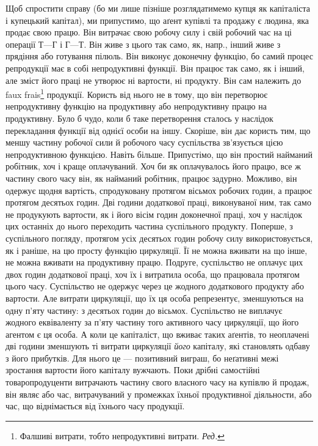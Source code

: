 Щоб спростити справу (бо ми лише пізніше розглядатимемо купця
як капіталіста і купецький капітал), ми припустимо, що аґент купівлі та
продажу є людина, яка продає свою працю. Він витрачає свою робочу
силу і свій робочий час на ці операції $Т — Г$ і $Г — Т$. Він живе з цього
так само, як, напр., інший живе з прядіння або готування пілюль. Він
виконує доконечну функцію, бо самий процес репродукції має в собі
непродуктивні функції. Він працює так само, як і інший, але зміст його
праці не утворює ні вартости, ні продукту. Він сам належить до faux
frais\footnote*{
Фалшиві витрати, тобто непродуктивні витрати. \emph{Ред.}
} продукції. Користь від нього не в тому, що він перетворює
непродуктивну функцію на продуктивну або непродуктивну працю на
продуктивну. Було б чудо, коли б таке перетворення сталось у наслідок
перекладання функції від однієї особи на іншу. Скоріше, він дає користь
тим, що меншу частину робочої сили й робочого часу суспільства
зв’язується цією непродуктивною функцією. Навіть більше. Припустімо,
що він простий найманий робітник, хоч і краще оплачуваний.
Хоч би    як оплачувалось його працю, все ж частину свого часу
він, як    найманий робітник, працює    задурно. Можливо, він
одержує щодня вартість, спродуковану протягом вісьмох робочих годин, а
працює протягом десятьох годин. Дві години додаткової праці, виконуваної
ним, так само не продукують вартости, як і його вісім годин
доконечної праці, хоч у наслідок цих останніх до нього переходить
частина суспільного продукту. Поперше, з суспільного погляду, протягом
усіх десятьох годин робочу силу використовується, як і раніше, на цю
просту функцію циркуляції. Її не можна вживати на що інше, не
можна вживати на продуктивну працю. Подруге, суспільство не оплачує
цих двох годин додаткової праці, хоч їх і витратила особа, що
працювала протягом цього часу. Суспільство не одержує через це жодного
додаткового продукту або вартости. Але витрати циркуляції, що їх
ця особа репрезентує, зменшуються на одну п’яту частину: з десятьох
годин до вісьмох. Суспільство не виплачує жодного еквіваленту за п’яту
частину того активного часу циркуляції, що його агентом є ця особа.
А коли це капіталіст, що вживає таких аґентів, то неоплачені дві години
зменшують ті витрати циркуляції \emph{його} капіталу, які становлять одбаву з його
прибутків. Для нього це — позитивний виграш, бо неґативні межі зростання
вартости його капіталу вужчають. Поки дрібні самостійні товаропродуценти
витрачають частину свого власного часу на купівлю й продаж,
він являє або час, витрачуваний у промежках їхньої продуктивної
діяльности, або час, що віднімається від їхнього часу продукції.


